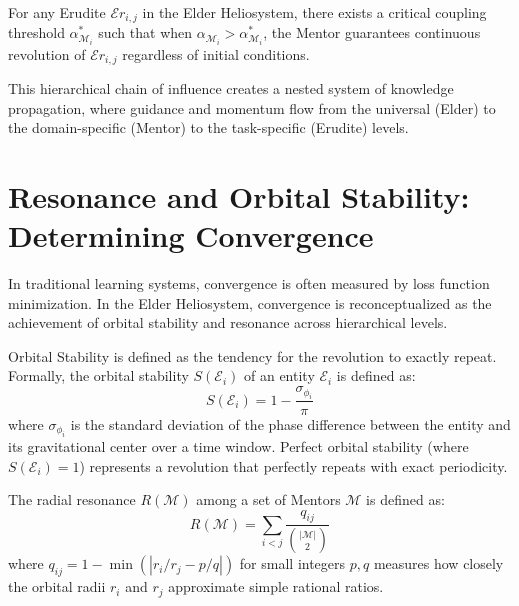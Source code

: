 \begin{corollary}
For any Erudite $\mathcal{E}r_{i,j}$ in the Elder Heliosystem, there exists a critical coupling threshold $\alpha_{\mathcal{M}_i}^*$ such that when $\alpha_{\mathcal{M}_i} > \alpha_{\mathcal{M}_i}^*$, the Mentor guarantees continuous revolution of $\mathcal{E}r_{i,j}$ regardless of initial conditions.
\end{corollary}

This hierarchical chain of influence creates a nested system of knowledge propagation, where guidance and momentum flow from the universal (Elder) to the domain-specific (Mentor) to the task-specific (Erudite) levels.

\section{Resonance and Orbital Stability: Determining Convergence}

In traditional learning systems, convergence is often measured by loss function minimization. In the Elder Heliosystem, convergence is reconceptualized as the achievement of orbital stability and resonance across hierarchical levels.

\begin{definition}
Orbital Stability is defined as the tendency for the revolution to exactly repeat. Formally, the orbital stability $S(\mathcal{E}_i)$ of an entity $\mathcal{E}_i$ is defined as:
\begin{equation}
S(\mathcal{E}_i) = 1 - \frac{\sigma_{\phi_i}}{\pi}
\end{equation}
where $\sigma_{\phi_i}$ is the standard deviation of the phase difference between the entity and its gravitational center over a time window. Perfect orbital stability (where $S(\mathcal{E}_i) = 1$) represents a revolution that perfectly repeats with exact periodicity.
\end{definition}

\begin{definition}
The radial resonance $R(\mathcal{M})$ among a set of Mentors $\mathcal{M}$ is defined as:
\begin{equation}
R(\mathcal{M}) = \sum_{i<j} \frac{q_{ij}}{\binom{|\mathcal{M}|}{2}}
\end{equation}
where $q_{ij} = 1 - \min(|r_i/r_j - p/q|)$ for small integers $p,q$ measures how closely the orbital radii $r_i$ and $r_j$ approximate simple rational ratios.
\end{definition}

